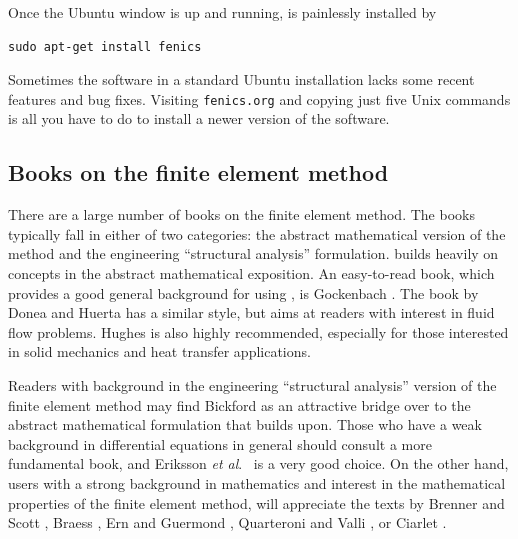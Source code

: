 Once the Ubuntu window
is up and running, \fenics{} is painlessly installed by
\vspace{4pt}
\begin{Verbatim}[numbers=none,frame=lines,label=\fbox{{\tiny Terminal}},fontsize=\fontsize{9pt}{9pt},
labelposition=topline,framesep=2.5mm,framerule=0.7pt]
sudo apt-get install fenics
\end{Verbatim}
Sometimes the \fenics{} software in a standard Ubuntu installation lacks
some recent features and bug fixes. Visiting {\fontsize{10pt}{10pt}\texttt{fenics.org}} and copying just
five Unix commands is all you have to do to install a newer version of
the software.


\subsection{Books on the finite element method}
\label{langtangen:appendix:books}
There are a large number of books on the finite element method.
The books typically fall in either of two categories: the abstract
mathematical version of the method and the engineering ``structural analysis''
formulation. \fenics{} builds heavily on concepts in the abstract
mathematical exposition.
An easy-to-read book, which provides a good general background for 
using \fenics,
is Gockenbach \cite{Gockenbach2006}. The book by Donea and Huerta
\cite{DoneaHuerta2003} has a similar style, but aims at readers with
interest in fluid flow problems. Hughes \cite{Hughes1987} is also
highly recommended, especially for those interested in solid mechanics
and heat transfer applications.

Readers with background in the engineering ``structural analysis''
version of the finite element method may find Bickford
\cite{Bickford1994} as an attractive bridge over to the abstract
mathematical formulation that \fenics{} builds upon.  Those who have a
weak background in differential equations in general should consult a
more fundamental book, and Eriksson {\em et al}.~\cite{ErikssonEstepHansboEtAl1996}
is a very good choice.  On the other hand, \fenics{} users with a
strong background in mathematics and interest in the mathematical
properties of the finite element method, will appreciate the texts by
Brenner and Scott \cite{BrennerScott2008}, Braess
\cite{Braess2007}, Ern and Guermond \cite{ErnGuermond2004},
Quarteroni and Valli \cite{QuarteroniValli1994}, or Ciarlet
\cite{Ciarlet2002}.


